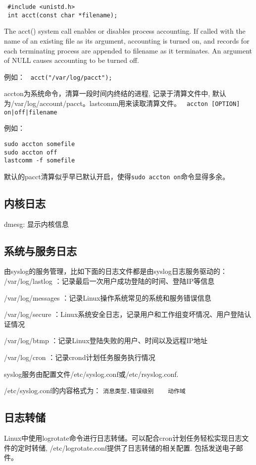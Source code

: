 \begin{verbatim}
 #include <unistd.h>
 int acct(const char *filename);
\end{verbatim}

The  acct()  system  call  enables  or  disables process accounting.  If called with the name of an existing file as its argument,
accounting is turned on, and records for each terminating process are appended to filename as it terminates.  An argument of  NULL
causes accounting to be turned off.

例如：
\verb+ acct("/var/log/pacct");+

accton为系统命令，清算一段时间内终结的进程, 记录于清算文件中, 默认为/var/log/account/pacct。lastcomm用来读取清算文件。
\verb+ accton [OPTION] on|off|filename+

例如：
\begin{verbatim}
sudo accton somefile
sudo accton off
lastcomm -f somefile
\end{verbatim}

默认的pacct清算似乎早已默认开启，使得\verb+sudo accton on+命令显得多余。


\subsection{内核日志}
dmesg: 显示内核信息

\subsection{系统与服务日志}
由syslog的服务管理，比如下面的日志文件都是由syslog日志服务驱动的：      
/var/log/lastlog ：记录最后一次用户成功登陆的时间、登陆IP等信息 

/var/log/messages ：记录Linux操作系统常见的系统和服务错误信息 

/var/log/secure ：Linux系统安全日志，记录用户和工作组变坏情况、用户登陆认证情况 

/var/log/btmp ：记录Linux登陆失败的用户、时间以及远程IP地址 

/var/log/cron ：记录crond计划任务服务执行情况

syslog服务由配置文件/etc/syslog.conf或/etc/rsyslog.conf.

/etc/syslog.conf的内容格式为：
\verb+消息类型.错误级别    动作域+

\subsection{日志转储}
Linux中使用logrotate命令进行日志转储。可以配合cron计划任务轻松实现日志文件的定时转储, /etc/logrotate.conf提供了日志转储的相关配置.
包括发送电子邮件。















